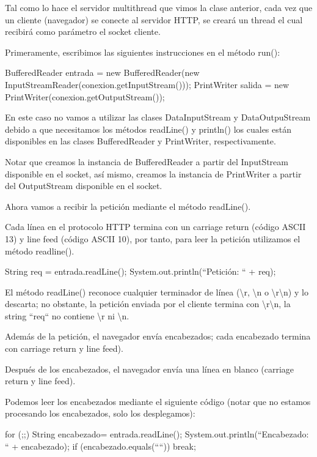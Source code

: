 Tal como lo hace el servidor multithread que vimos la clase anterior, cada vez que un cliente (navegador) se conecte al servidor HTTP, se creará un thread el cual recibirá como parámetro el socket cliente.

Primeramente, escribimos las siguientes instrucciones en el método run():

\begin{SourceCode}
BufferedReader entrada = new BufferedReader(new InputStreamReader(conexion.getInputStream()));
PrintWriter salida = new PrintWriter(conexion.getOutputStream());
\end{SourceCode}

En este caso no vamos a utilizar las clases DataInputStream y DataOutpuStream debido a que necesitamos los métodos readLine() y println() los cuales están disponibles en las clases BufferedReader y PrintWriter, respectivamente.

Notar que creamos la instancia de BufferedReader a partir del InputStream disponible en el socket, así mismo, creamos la instancia de PrintWriter a partir del OutputStream disponible en el socket.

Ahora vamos a recibir la petición mediante el método readLine().

Cada línea en el protocolo HTTP termina con un carriage return (código ASCII 13) y line feed (código ASCII 10), por tanto, para leer la petición utilizamos el método readline().

\begin{SourceCode}
String req = entrada.readLine();
System.out.println(``Petición: `` + req);
\end{SourceCode}

El método readLine() reconoce cualquier terminador de línea (\textbackslash{}r, \textbackslash{}n o \textbackslash{}r\textbackslash{}n) y lo descarta; no obstante, la petición enviada por el cliente termina con \textbackslash{}r\textbackslash{}n, la string ``req`` no contiene \textbackslash{}r ni \textbackslash{}n.

Además de la petición, el navegador envía encabezados; cada encabezado termina con carriage return  y line feed).

Después de los encabezados, el navegador envía una línea en blanco (carriage return  y line feed).

Podemos leer los encabezados mediante el siguiente código (notar que no estamos procesando los encabezados, solo los desplegamos):

\begin{SourceCode}
for (;;)
{
  String encabezado= entrada.readLine();
  System.out.println(``Encabezado: `` + encabezado);
  if (encabezado.equals(````)) break;
}
\end{SourceCode}

